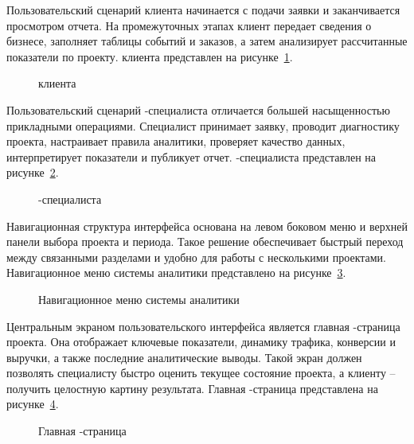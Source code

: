 Пользовательский сценарий клиента начинается с подачи заявки и заканчивается просмотром отчета. На промежуточных этапах клиент передает сведения о бизнесе, заполняет таблицы событий и заказов, а затем анализирует рассчитанные показатели по проекту.  клиента представлен на рисунке~\ref{fig:user-flow-client}.

\begin{figure}[H]
    \centering
    \caption{ клиента}
    \label{fig:user-flow-client}
\end{figure}

Пользовательский сценарий -специалиста отличается большей насыщенностью прикладными операциями. Специалист принимает заявку, проводит диагностику проекта, настраивает правила аналитики, проверяет качество данных, интерпретирует показатели и публикует отчет.  -специалиста представлен на рисунке~\ref{fig:user-flow-seo}.

\begin{figure}[H]
    \centering
    \caption{ -специалиста}
    \label{fig:user-flow-seo}
\end{figure}

Навигационная структура интерфейса основана на левом боковом меню и верхней панели выбора проекта и периода. Такое решение обеспечивает быстрый переход между связанными разделами и удобно для работы с несколькими проектами. Навигационное меню системы аналитики представлено на рисунке~\ref{fig:navigation-menu}.

\begin{figure}[H]
    \centering
    \caption{Навигационное меню системы аналитики}
    \label{fig:navigation-menu}
\end{figure}

Центральным экраном пользовательского интерфейса является главная -страница проекта. Она отображает ключевые показатели, динамику трафика, конверсии и выручки, а также последние аналитические выводы. Такой экран должен позволять специалисту быстро оценить текущее состояние проекта, а клиенту -- получить целостную картину результата. Главная -страница представлена на рисунке~\ref{fig:main-dashboard}.

\begin{figure}[H]
    \centering
    \caption{Главная -страница}
    \label{fig:main-dashboard}
\end{figure}

